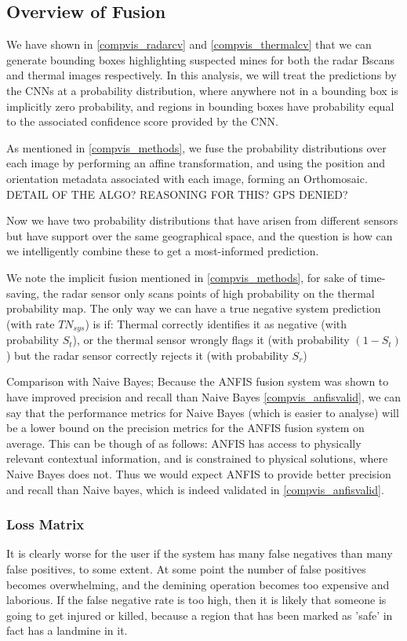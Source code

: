 \subsection{Overview of Fusion} \label{fusion_overview}

    We have shown in \ref{compvis_radarcv} and \ref{compvis_thermalcv} that we can generate bounding boxes highlighting suspected mines for both the radar Bscans and thermal images respectively. In this analysis, we will treat the predictions by the CNNs at a probability distribution, where anywhere not in a bounding box is implicitly zero probability, and regions in bounding boxes have probability equal to the associated confidence score provided by the CNN.
    
    As mentioned in \ref{compvis_methods}, we fuse the probability distributions over each image by performing an affine transformation, and using the position and orientation metadata associated with each image, forming an Orthomosaic. DETAIL OF THE ALGO? REASONING FOR THIS? GPS DENIED? 
    
    Now we have two probability distributions that have arisen from different sensors but have support over the same geographical space, and the question is how can we intelligently combine these to get a most-informed prediction.
    
    
    We note the implicit fusion mentioned in \ref{compvis_methods}, for sake of time-saving, the radar sensor only scans points of high probability on the thermal probability map. The only way we can have a true negative system prediction (with rate $TN_{sys}$) is if: Thermal correctly identifies it as negative (with probability $S_t$), or the thermal sensor wrongly flags it (with probability $(1-S_t)$) but the radar sensor correctly rejects it (with probability $S_r$)
    
    Comparison with Naive Bayes; Because the ANFIS fusion system was shown to have improved precision and recall than Naive Bayes \ref{compvis_anfisvalid}, we can say that the performance metrics for Naive Bayes (which is easier to analyse) will be a lower bound on the precision metrics for the ANFIS fusion system on average. This can be though of as follows: ANFIS has access to physically relevant contextual information, and is constrained to physical solutions, where Naive Bayes does not. Thus we would expect ANFIS to provide better precision and recall than Naive bayes, which is indeed validated in \ref{compvis_anfisvalid}.
    
    \subsubsection{Loss Matrix} \label{lossmatrix}
        
        It is clearly worse for the user if the system has many false negatives than many false positives, to some extent. At some point the number of false positives becomes overwhelming, and the demining operation becomes too expensive and laborious. If the false negative rate is too high, then it is likely that someone is going to get injured or killed, because a region that has been marked as 'safe' in fact has a landmine in it.